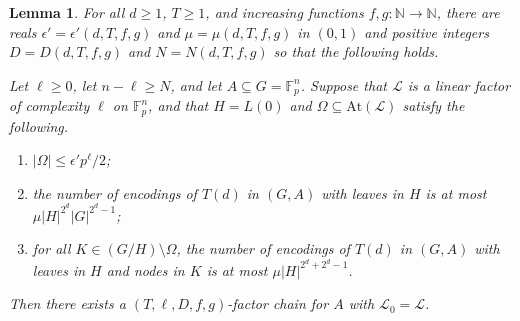 \documentclass[12pt,oneside,british,a4wide]{amsart}
\newtheorem{lemma}[theorem]{Lemma}
\numberwithin{equation}{section}
\theoremstyle{definition}
\def\F{\mathbb{F}}
\def\e{\epsilon}
\newcommand{\calL}{\mathcal{L}}
\newcommand{\At}{{\mathrm{At}}}
\begin{document}
\begin{lemma}\label{lem:chainlinearnew}
For all $d\geq 1$, $T\geq 1$, and increasing functions $f,g:\mathbb{N}\rightarrow \mathbb{N}$, there are reals $\e'=\e'(d,T,f,g)$ and  $\mu=\mu(d, T,f,g)$ in $(0,1)$ and positive integers  $D=D(d, T,f,g)$ and $N=N(d, T,f,g)$ so that the following holds.

Let $\ell\geq 0$, let $n-\ell\geq N$,  and let $A\subseteq G=\F_p^n$. Suppose that  $\calL$ is a linear factor of complexity $\ell$ on $\F_p^n$, and that $H=L(0)$ and $\Omega\subseteq \At(\calL)$ satisfy the following.
\begin{enumerate}[label=\normalfont(\roman*)]
\item $|\Omega|\leq \e' p^{\ell}/2$;
\item  the number of encodings of $T(d)$ in $(G,A)$ with leaves in $H$ is at most $\mu |H|^{2^d}|G|^{2^d-1}$;
\item for all $K\in (G/H)\setminus \Omega$, the number of encodings of $T(d)$ in $(G,A)$ with leaves in $H$ and nodes in $K$ is at most $\mu |H|^{2^d+2^d-1}$.
\end{enumerate}
Then there exists a  $(T,\ell, D, f,g)$-factor chain for $A$ with $\calL_0=\calL$.
\end{lemma}
\end{document}
